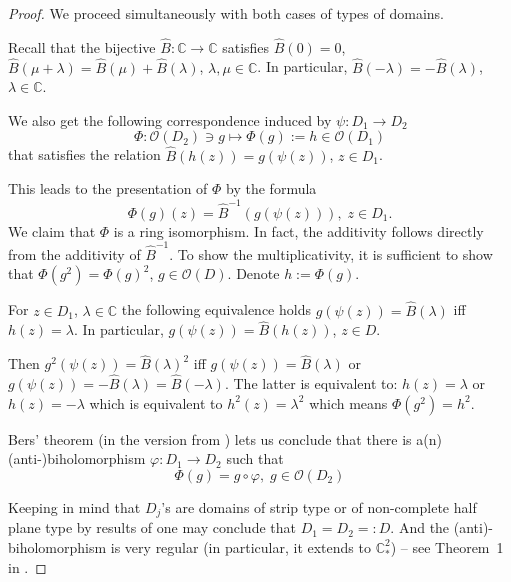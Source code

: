 \documentclass[a4paper,12pt]{amsart}
\theoremstyle{definition}
\begin{document}
\begin{proof} We proceed simultaneously with both cases of types of domains.

Recall that the bijective $\widehat{B} \colon \mathbb C\to\mathbb C$ satisfies $\hat{B}(0)=0$, $\hat{B}(\mu+\lambda)=\hat{B}(\mu)+\hat{B}(\lambda)$, $\lambda,\mu\in\mathbb C$. In particular, $\hat{B}(-\lambda)=-\hat{B}(\lambda)$, $\lambda\in\mathbb C$.

We also get the following correspondence induced by $\psi \colon D_1\to D_2$ 
\begin{equation}
    \Phi \colon \mathcal O(D_2)\owns g \mapsto \Phi(g):=h\in\mathcal O(D_1)
\end{equation}
that satisfies the relation $\widehat{B}(h(z))=g(\psi(z))$, $z\in D_1$.

This leads to the presentation of $\Phi$ by the formula
\begin{equation}
    \Phi(g)(z)=\hat{B}^{-1}(g(\psi(z))),\; z\in D_1.
\end{equation}
We claim that $\Phi$ is a ring isomorphism. In fact, the additivity follows directly from the additivity of $\hat{B}^{-1}$. To show the multiplicativity, it is sufficient to show that $\Phi(g^2)=\Phi(g)^2$, $g\in\mathcal O(D)$. Denote $h:=\Phi(g)$.

For $z\in D_1$, $\lambda\in\mathbb C$ the following equivalence holds $g(\psi(z))=\hat{B}(\lambda)$ iff $h(z)=\lambda$. In particular, $g(\psi(z))=\widehat{B}(h(z))$, $z\in D$.

Then $g^2(\psi(z))=\hat{B}(\lambda)^2$ iff $g(\psi(z))=\hat{B}(\lambda)$ or $g(\psi(z))=-\hat{B}(\lambda)=\hat{B}(-\lambda)$. The latter is equivalent to: $h(z)=\lambda$ or $h(z)=-\lambda$ which is equivalent to $h^2(z)=\lambda^2$ which means $\Phi(g^2)=h^2$.

Bers' theorem (in the version from \cite{MR0185143}) lets us conclude that there is a(n) (anti-)biholomorphism $\varphi \colon D_1\to D_2$ such that
\begin{equation}\label{equation:conjugation}
    \Phi(g)=g\circ\varphi,\; g\in\mathcal O(D_2)
\end{equation}

Keeping in mind that $D_j$'s are domains of strip type or of     non-complete half plane type by results of \cite{05208635} one may conclude that $D_1=D_2=:D$. And the (anti)-biholomorphism is very regular (in particular, it extends to $\mathbb C_*^2$) -- see Theorem~1 in \cite{05208635}.



\end{proof}
\end{document}
